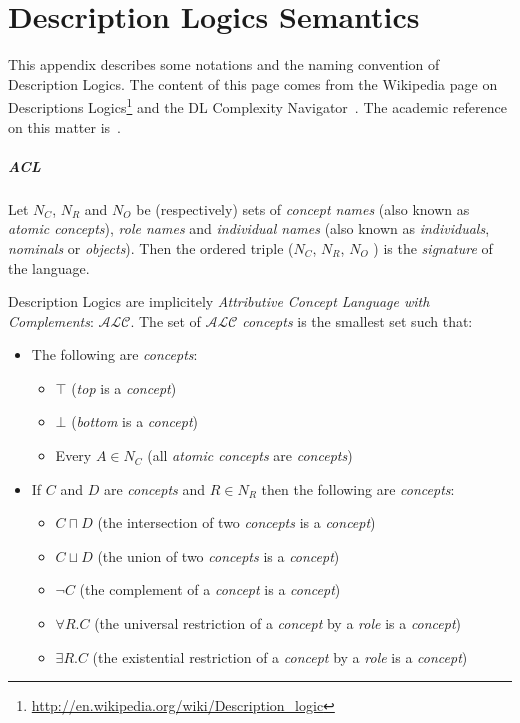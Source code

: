 \chapter{Description Logics Semantics}
\label{chapt|dl}

This appendix describes some notations and the naming convention of Description
Logics. The content of this page comes from the Wikipedia page on Descriptions
Logics\footnote{\url{http://en.wikipedia.org/wiki/Description_logic}} and the
DL Complexity Navigator~\cite{ZolinDLComplexityNavigator}. The academic reference
on this matter is~\cite{Baader2008}.


\paragraph{ACL} Let $N_C$, $N_R$ and $N_O$  be (respectively) sets of \emph{concept names}
(also known as \emph{atomic concepts}), \emph{role names} and \emph{individual
names} (also known as \emph{individuals}, \emph{nominals} or \emph{objects}).
Then the ordered triple ($N_C$, $N_R$, $N_O$ ) is the \emph{signature} of the
language.

Description Logics are implicitely \emph{Attributive Concept Language with
Complements}: $\mathcal{ALC}$.  The set of $\mathcal{ALC}$ \emph{concepts} is
the smallest set such that:

\begin{itemize}
    \item The following are \emph{concepts}:
    \begin{itemize}
        \item $\top$ (\emph{top} is a \emph{concept})
        \item $\bot$ (\emph{bottom} is a \emph{concept})
        \item Every $A \in N_C$ (all \emph{atomic concepts} are \emph{concepts})
    \end{itemize}

\item If $C$ and $D$ are \emph{concepts} and $R \in N_R$ then the following are \emph{concepts}:
        \begin{itemize}
            \item $C\sqcap D$ (the intersection of two \emph{concepts} is a \emph{concept})
            \item $C\sqcup D$ (the union of two \emph{concepts} is a \emph{concept})
            \item $\neg C$ (the complement of a \emph{concept} is a \emph{concept})
            \item $\forall R.C$ (the universal restriction of a \emph{concept} by a \emph{role} is a \emph{concept})
            \item $\exists R.C$ (the existential restriction of a \emph{concept} by a \emph{role} is a \emph{concept})
        \end{itemize}

\end{itemize}

